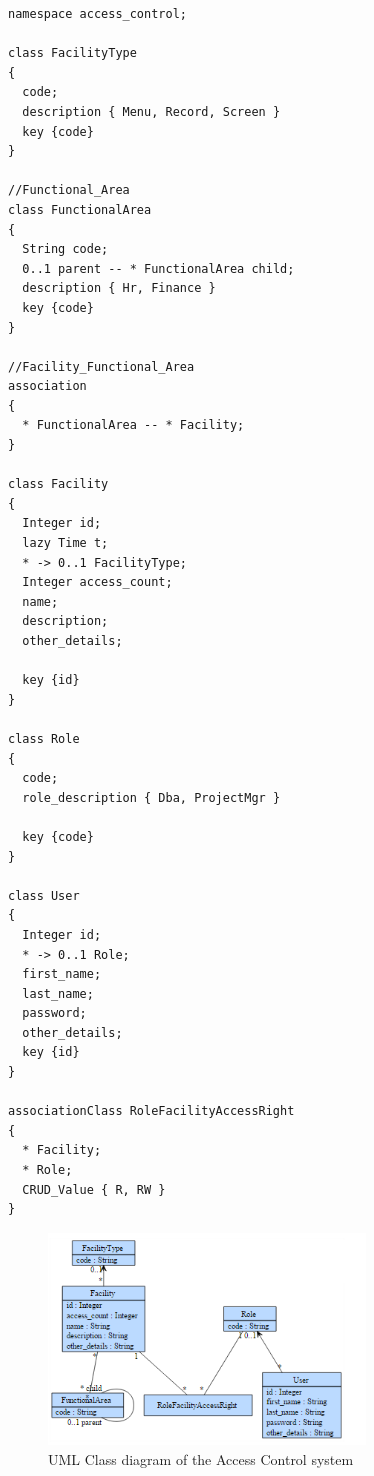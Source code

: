 \begin{lstlisting}[style=umpleIn,caption=Umple Model for an Access Control System, label=lst:accessControlEx]
namespace access_control;

class FacilityType
{
  code;
  description { Menu, Record, Screen }
  key {code}
}

//Functional_Area
class FunctionalArea
{
  String code;
  0..1 parent -- * FunctionalArea child;
  description { Hr, Finance }
  key {code}  
}

//Facility_Functional_Area
association
{
  * FunctionalArea -- * Facility;
}

class Facility
{
  Integer id;
  lazy Time t; 
  * -> 0..1 FacilityType;
  Integer access_count;
  name;
  description;
  other_details;
  
  key {id}
}

class Role
{
  code;
  role_description { Dba, ProjectMgr }
  
  key {code}
}

class User
{
  Integer id;
  * -> 0..1 Role;
  first_name;
  last_name;
  password;
  other_details;
  key {id}
}

associationClass RoleFacilityAccessRight
{
  * Facility;
  * Role;
  CRUD_Value { R, RW }
}
\end{lstlisting}

\begin{figure}[h]
\centering
\includegraphics[width=0.75\textwidth]{Figures/accessControl.png} 
\caption{UML Class diagram of the Access Control system}
\label{fig:accessControlExample}
\end{figure}

